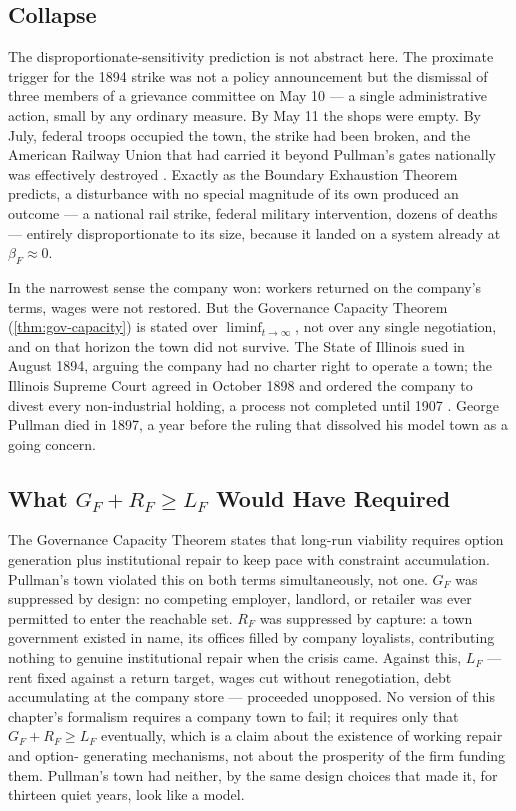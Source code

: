 \documentclass[12pt,twoside,openright]{book}
\begin{document}
\subsection{Collapse}

The disproportionate-sensitivity prediction is not abstract here.
The proximate trigger for the 1894 strike was not a policy
announcement but the dismissal of three members of a grievance
committee on May 10 --- a single administrative action,
small by any ordinary measure. By May 11 the shops were empty.
By July, federal troops occupied the town, the strike had been
broken, and the American Railway Union that had carried it
beyond Pullman's gates nationally was effectively destroyed
\parencite{lindsey1942}. Exactly as the Boundary Exhaustion
Theorem predicts, a disturbance with no special magnitude of its
own produced an outcome --- a national rail strike, federal
military intervention, dozens of deaths --- entirely
disproportionate to its size, because it landed on a system
already at $\beta_F \approx 0$.

In the narrowest sense the company won: workers returned on the
company's terms, wages were not restored. But the Governance
Capacity Theorem (\cref{thm:gov-capacity}) is stated over
$\liminf_{t\to\infty}$, not over any single negotiation, and on
that horizon the town did not survive. The State of Illinois sued
in August 1894, arguing the company had no charter right to
operate a town; the Illinois Supreme Court agreed in October
1898 and ordered the company to divest every non-industrial
holding, a process not completed until 1907
\parencite{buder1967}. George Pullman died in 1897, a year before
the ruling that dissolved his model town as a going concern.

\subsection{What \texorpdfstring{$G_F + R_F \ge L_F$}{GF + RF >= LF} Would Have Required}

The Governance Capacity Theorem states that long-run viability
requires option generation plus institutional repair to keep pace
with constraint accumulation. Pullman's town violated this on
both terms simultaneously, not one. $G_F$ was suppressed by
design: no competing employer, landlord, or retailer was ever
permitted to enter the reachable set. $R_F$ was suppressed by
capture: a town government existed in name, its offices filled
by company loyalists, contributing nothing to genuine institutional
repair when the crisis came. Against this, $L_F$ --- rent fixed
against a return target, wages cut without renegotiation, debt
accumulating at the company store --- proceeded unopposed. No
version of this chapter's formalism requires a company town to
fail; it requires only that $G_F + R_F \ge L_F$ eventually, which
is a claim about the existence of working repair and option-
generating mechanisms, not about the prosperity of the firm
funding them. Pullman's town had neither, by the same design
choices that made it, for thirteen quiet years, look like a
model.
\end{document}
